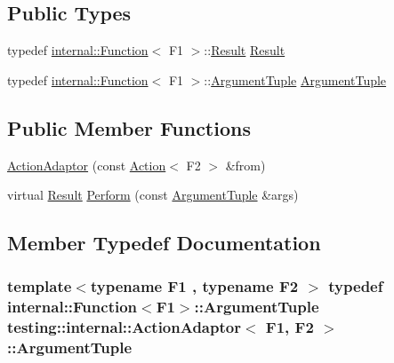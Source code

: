 \subsection*{Public Types}
\begin{DoxyCompactItemize}
\item 
typedef \hyperlink{structtesting_1_1internal_1_1Function}{internal\+::\+Function}$<$ F1 $>$\+::\hyperlink{classtesting_1_1internal_1_1ActionAdaptor_afa8f7872b6db3d8f1545fd98b45b0b95}{Result} \hyperlink{classtesting_1_1internal_1_1ActionAdaptor_afa8f7872b6db3d8f1545fd98b45b0b95}{Result}
\item 
typedef \hyperlink{structtesting_1_1internal_1_1Function}{internal\+::\+Function}$<$ F1 $>$\+::\hyperlink{classtesting_1_1internal_1_1ActionAdaptor_a4f78fb73f97b72fea8a93b78a8ab5704}{Argument\+Tuple} \hyperlink{classtesting_1_1internal_1_1ActionAdaptor_a4f78fb73f97b72fea8a93b78a8ab5704}{Argument\+Tuple}
\end{DoxyCompactItemize}
\subsection*{Public Member Functions}
\begin{DoxyCompactItemize}
\item 
\hyperlink{classtesting_1_1internal_1_1ActionAdaptor_a24ba3330ef3cc365b956c50ec73e4177}{Action\+Adaptor} (const \hyperlink{classtesting_1_1Action}{Action}$<$ F2 $>$ \&from)
\item 
virtual \hyperlink{classtesting_1_1internal_1_1ActionAdaptor_afa8f7872b6db3d8f1545fd98b45b0b95}{Result} \hyperlink{classtesting_1_1internal_1_1ActionAdaptor_a8d8a47a31f068cf6e0c95b91605d5540}{Perform} (const \hyperlink{classtesting_1_1internal_1_1ActionAdaptor_a4f78fb73f97b72fea8a93b78a8ab5704}{Argument\+Tuple} \&args)
\end{DoxyCompactItemize}


\subsection{Member Typedef Documentation}
\subsubsection[{\texorpdfstring{Argument\+Tuple}{ArgumentTuple}}]{\setlength{\rightskip}{0pt plus 5cm}template$<$typename F1 , typename F2 $>$ typedef {\bf internal\+::\+Function}$<$F1$>$\+::{\bf Argument\+Tuple} {\bf testing\+::internal\+::\+Action\+Adaptor}$<$ F1, F2 $>$\+::{\bf Argument\+Tuple}}\hypertarget{classtesting_1_1internal_1_1ActionAdaptor_a4f78fb73f97b72fea8a93b78a8ab5704}{}\label{classtesting_1_1internal_1_1ActionAdaptor_a4f78fb73f97b72fea8a93b78a8ab5704}
